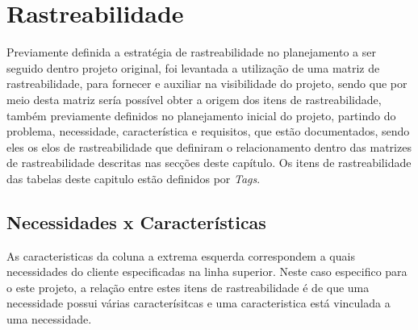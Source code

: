 \chapter{Rastreabilidade}

Previamente definida a estratégia de rastreabilidade no planejamento a ser seguido dentro projeto original, foi levantada a utilização de uma matriz de rastreabilidade, para fornecer e auxiliar na visibilidade do projeto, sendo que por meio desta matriz sería possível obter a origem dos itens de rastreabilidade, também previamente definidos no planejamento inicial do projeto, partindo do problema, necessidade, característica e requisitos, que estão documentados, sendo eles os elos de rastreabilidade que definiram o relacionamento dentro das matrizes de rastreabilidade descritas nas secções deste capítulo. Os itens de rastreabilidade  das tabelas deste capitulo estão definidos por \textit{Tags}.

\section{Necessidades x Características}

As caracteristicas da coluna a extrema esquerda correspondem a quais necessidades do cliente especificadas na linha superior. Neste caso especifico para o este projeto, a relação entre estes itens de rastreabilidade é de que uma necessidade possui várias caracterísitcas e uma caracteristica está vinculada a uma necessidade.

